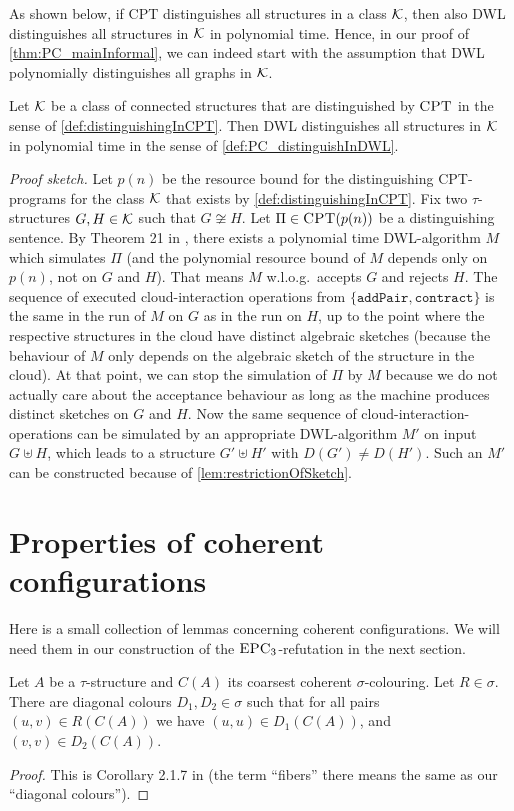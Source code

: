 \documentclass[a4paper,UKenglish,cleveref, autoref, thm-restate]{lipics-v2021}
\newcommand{\CPT}{\mbox{\sc CPT}}
\newcommand{\EPC}{\mbox{\sc EPC}}
\newcommand{\Kk}{{\cal K}}
\newcommand{\pairOp }{\texttt{addPair}}
\newcommand{\sccOp }{\texttt{contract}}
\begin{document}
	As shown below, if CPT distinguishes all structures in a class $\Kk$, then also DWL distinguishes all structures in $\Kk$ in polynomial time. Hence, in our proof of \autoref{thm:PC_mainInformal}, we can indeed start with the assumption that DWL polynomially distinguishes all graphs in $\Kk$.
	\begin{lemma}
		\label{lem:connectionDWLdistinguishabilityCPT}
		Let $\Kk$ be a class of connected structures that are distinguished by $\CPT$ in the sense of \autoref{def:distinguishingInCPT}.
		Then DWL distinguishes all structures in $\Kk$ in polynomial time in the sense of \autoref{def:PC_distinguishInDWL}.
	\end{lemma}
	\textit{Proof sketch.} 	Let $p(n)$ be the resource bound for the distinguishing CPT-programs for the class $\Kk$ that exists by \autoref{def:distinguishingInCPT}.
	Fix two $\tau$-structures $G, H \in \Kk$ such that $G \not\cong H$. Let $\Pi \in \CPT(p(n))$ be a distinguishing sentence. By Theorem 21 in \cite{dwl}, there exists a polynomial time DWL-algorithm $M$ which simulates $\Pi$ (and the polynomial resource bound of $M$ depends only on $p(n)$, not on $G$ and $H$). That means $M$ w.l.o.g.\ accepts $G$ and rejects $H$. The sequence of executed cloud-interaction operations from $\{ \pairOp, \sccOp  \}$ is the same in the run of $M$ on $G$ as in the run on $H$, up to the point where the respective structures in the cloud have distinct algebraic sketches (because the behaviour of $M$ only depends on the algebraic sketch of the structure in the cloud). At that point, we can stop the simulation of $\Pi$ by $M$ because we do not actually care about the acceptance behaviour as long as the machine produces distinct sketches on $G$ and $H$. Now the same sequence of cloud-interaction-operations can be simulated by an appropriate DWL-algorithm $M'$ on input $G\uplus H$, which leads to a structure $G' \uplus H'$ with $D(G') \neq D(H')$. Such an $M'$ can be constructed because of \autoref{lem:restrictionOfSketch}.  \qedsymbol
	
	
	
	
	\section{Properties of coherent configurations}
	\label{sec:coherentConfigurations}
	Here is a small collection of lemmas concerning coherent configurations. We will need them in our construction of the $\EPC_3$-refutation in the next section.
	\begin{lemma}
		\label{lem:PC_endpointsColour}
		Let $A$ be a $\tau$-structure and $C(A)$ its coarsest coherent $\sigma$-colouring. Let $R \in \sigma$. There are diagonal colours $D_1, D_2 \in \sigma$ such that for all pairs $(u,v) \in R(C(A))$ we have $(u,u) \in D_1(C(A))$, and $(v,v) \in D_2(C(A))$. 
	\end{lemma}
	\begin{proof}
		This is Corollary 2.1.7 in \cite{chen2019lectures} (the term ``fibers'' there means the same as our ``diagonal colours'').
	\end{proof}
	
\end{document}
